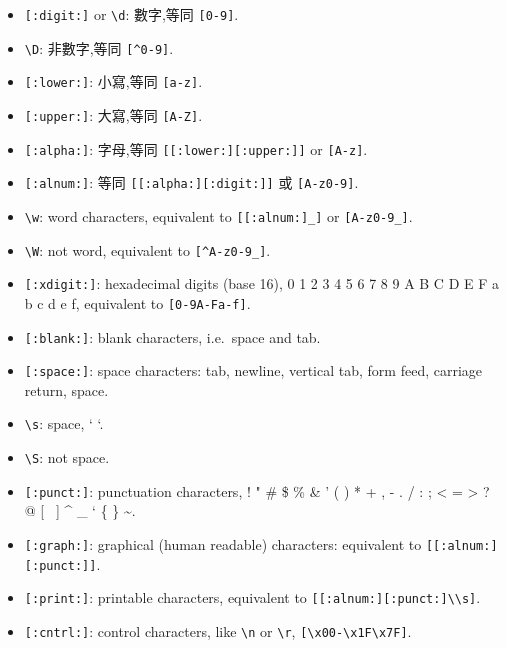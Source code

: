 \documentclass[]{book}
\providecommand{\tightlist}{%
  \setlength{\itemsep}{0pt}\setlength{\parskip}{0pt}}
\theoremstyle{definition}
\theoremstyle{definition}
\theoremstyle{definition}
\theoremstyle{remark}
\begin{document}
\begin{itemize}
\tightlist
\item
  \texttt{{[}:digit:{]}} or \texttt{\textbackslash{}d}: 數字,等同
  \texttt{{[}0-9{]}}.\\
\item
  \texttt{\textbackslash{}D}: 非數字,等同 \texttt{{[}\^{}0-9{]}}.\\
\item
  \texttt{{[}:lower:{]}}: 小寫,等同 \texttt{{[}a-z{]}}.\\
\item
  \texttt{{[}:upper:{]}}: 大寫,等同 \texttt{{[}A-Z{]}}.\\
\item
  \texttt{{[}:alpha:{]}}: 字母,等同
  \texttt{{[}{[}:lower:{]}{[}:upper:{]}{]}} or \texttt{{[}A-z{]}}.\\
\item
  \texttt{{[}:alnum:{]}}: 等同 \texttt{{[}{[}:alpha:{]}{[}:digit:{]}{]}}
  或 \texttt{{[}A-z0-9{]}}.\\
\item
  \texttt{\textbackslash{}w}: word characters, equivalent to
  \texttt{{[}{[}:alnum:{]}\_{]}} or \texttt{{[}A-z0-9\_{]}}.\\
\item
  \texttt{\textbackslash{}W}: not word, equivalent to
  \texttt{{[}\^{}A-z0-9\_{]}}.\\
\item
  \texttt{{[}:xdigit:{]}}: hexadecimal digits (base 16), 0 1 2 3 4 5 6 7
  8 9 A B C D E F a b c d e f, equivalent to \texttt{{[}0-9A-Fa-f{]}}.
\item
  \texttt{{[}:blank:{]}}: blank characters, i.e.~space and tab.\\
\item
  \texttt{{[}:space:{]}}: space characters: tab, newline, vertical tab,
  form feed, carriage return, space.
\item
  \texttt{\textbackslash{}s}: space, ` `.\\
\item
  \texttt{\textbackslash{}S}: not space.\\
\item
  \texttt{{[}:punct:{]}}: punctuation characters, ! " \# \$ \% \& ' ( )
  * + , - . / : ; \textless{} = \textgreater{} ? @ {[} ~{]} \^{} \_ ` \{
  \textbar{} \} \textasciitilde{}.
\item
  \texttt{{[}:graph:{]}}: graphical (human readable) characters:
  equivalent to \texttt{{[}{[}:alnum:{]}{[}:punct:{]}{]}}.
\item
  \texttt{{[}:print:{]}}: printable characters, equivalent to
  \texttt{{[}{[}:alnum:{]}{[}:punct:{]}\textbackslash{}\textbackslash{}s{]}}.
\item
  \texttt{{[}:cntrl:{]}}: control characters, like
  \texttt{\textbackslash{}n} or \texttt{\textbackslash{}r},
  \texttt{{[}\textbackslash{}x00-\textbackslash{}x1F\textbackslash{}x7F{]}}.
\end{itemize}
\end{document}
